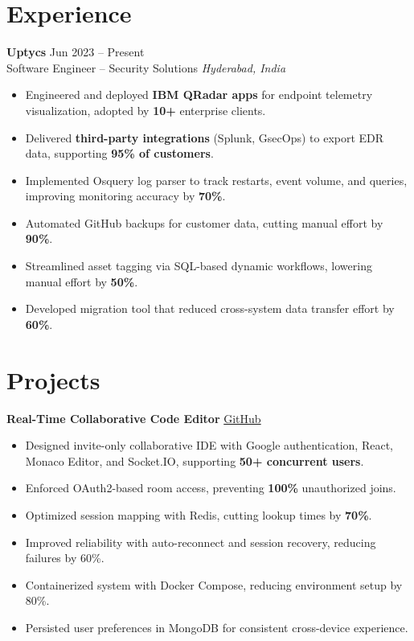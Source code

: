\documentclass[a4paper,10pt]{article}
\newcommand{\resumeItem}[1]{\item\small{#1}}
\newcommand{\resumeSubheading}[4]{
  \vspace{2pt}\textbf{#1} \hfill {#2}\\
  {\small#3} \hfill {\small\textit{#4}}\\[-4pt]
}
\begin{document}
\section*{Experience}
\resumeSubheading{Uptycs}{Jun 2023 -- Present}{Software Engineer – Security Solutions}{Hyderabad, India}
\begin{itemize}[leftmargin=*,itemsep=2pt]
  \resumeItem{Engineered and deployed \textbf{IBM QRadar apps} for endpoint telemetry visualization, adopted by \textbf{10+} enterprise clients.}
  \resumeItem{Delivered \textbf{third-party integrations} (Splunk, GsecOps) to export EDR data, supporting \textbf{95\% of customers}.}
  \resumeItem{Implemented Osquery log parser to track restarts, event volume, and queries, improving monitoring accuracy by \textbf{70\%}.}
  \resumeItem{Automated GitHub backups for customer data, cutting manual effort by \textbf{90\%}.}
  \resumeItem{Streamlined asset tagging via SQL-based dynamic workflows, lowering manual effort by \textbf{50\%}.}
  \resumeItem{Developed migration tool that reduced cross-system data transfer effort by \textbf{60\%}.}
\end{itemize}

\section*{Projects}
\textbf{Real-Time Collaborative Code Editor} \hfill \href{https://github.com/mohankumarkadiri/collab-code-editor}{GitHub}
\vspace{6pt}
\begin{itemize}[leftmargin=*,itemsep=2pt]
  \resumeItem{Designed invite-only collaborative IDE with Google authentication, React, Monaco Editor, and Socket.IO, supporting \textbf{50+ concurrent users}.}
  \resumeItem{Enforced OAuth2-based room access, preventing \textbf{100\%} unauthorized joins.}
  \resumeItem{Optimized session mapping with Redis, cutting lookup times by \textbf{70\%}.}
  \resumeItem{Improved reliability with auto-reconnect and session recovery, reducing failures by 60\%.}
  \resumeItem{Containerized system with Docker Compose, reducing environment setup by 80\%.}
  \resumeItem{Persisted user preferences in MongoDB for consistent cross-device experience.}
\end{itemize}

\vspace{6pt}
\end{document}
